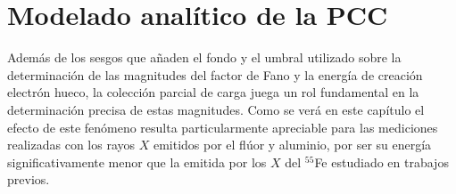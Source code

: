 \chapter{Modelado analítico de la PCC \label{chap:ModeloPCC}}
\noindent Además de los sesgos que añaden el fondo y el umbral utilizado sobre la determinación de las magnitudes del factor de Fano y la energía de creación electrón hueco, la colección parcial de carga juega un rol fundamental en la determinación precisa de estas magnitudes. Como se verá en este capítulo el efecto de este fenómeno resulta particularmente apreciable para las mediciones realizadas con los rayos $X$ emitidos por el flúor y aluminio, por ser su energía significativamente menor que la emitida por los $X$ del $^{55}$Fe estudiado en trabajos previos\cite{TesisAndi,TesisKevin,Rodrigues}.

